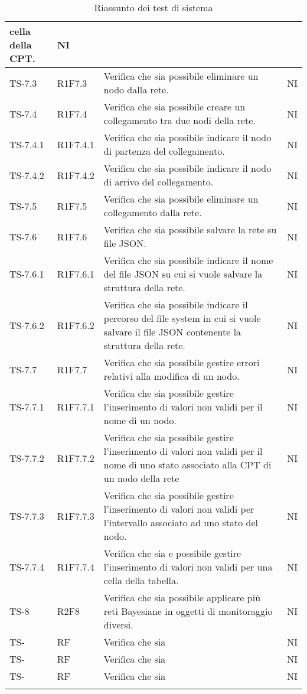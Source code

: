 \begin{longtable}{|C{2.5cm}|C{2.5cm}|C{6.5cm}|C{1.5cm}|}
			cella della CPT.  & {NI}\\
			\hline
			{TS-7.3} & {R1F7.3} & Verifica che sia possibile eliminare un
			nodo dalla rete.  & {NI}\\
			\hline
			{TS-7.4} & {R1F7.4} & Verifica che sia possibile creare un
			collegamento tra due nodi della rete.  & {NI}\\
			\hline
			{TS-7.4.1} & {R1F7.4.1} & Verifica che sia possibile indicare il nodo
			di partenza del collegamento.  & {NI}\\
			\hline
			{TS-7.4.2} & {R1F7.4.2} & Verifica che sia possibile indicare il nodo
			di arrivo del collegamento.  & {NI}\\
			\hline
			{TS-7.5} & {R1F7.5} & Verifica che sia possibile eliminare un
			collegamento dalla rete.  & {NI}\\
			\hline
			{TS-7.6} & {R1F7.6} & Verifica che sia possibile salvare la rete su
			file JSON.  & {NI}\\
			\hline
			{TS-7.6.1} & {R1F7.6.1} & Verifica che sia possibile indicare il nome
			del file JSON su cui si vuole salvare la
			struttura della rete.  & {NI}\\
			\hline
			{TS-7.6.2} & {R1F7.6.2} & Verifica che sia possibile indicare il
			percorso del file system in cui si vuole
			salvare il file JSON contenente la
			struttura della rete.  & {NI}\\
			\hline
			{TS-7.7} & {R1F7.7} & Verifica che sia possibile gestire errori
			relativi alla modifica di un nodo.  & {NI}\\
			\hline
			{TS-7.7.1} & {R1F7.7.1} & Verifica che sia  possibile gestire
			l'inserimento di valori non validi per il
			nome di un nodo.  & {NI}\\
			\hline
			{TS-7.7.2} & {R1F7.7.2} & Verifica che sia possibile gestire
			l'inserimento di valori non validi per il
			nome di uno stato associato alla CPT
			di un nodo della rete  & {NI}\\
			\hline
			{TS-7.7.3} & {R1F7.7.3} & Verifica che sia possibile gestire
			l'inserimento di valori non validi per
			l'intervallo associato ad uno stato del
			nodo.
  & {NI}\\
			\hline
			{TS-7.7.4} & {R1F7.7.4} & Verifica che sia e possibile gestire
			l'inserimento di valori non validi per
			una cella della tabella.  & {NI}\\
			\hline
			{TS-8} & {R2F8} & Verifica che sia possibile applicare più reti
			Bayesiane in oggetti di monitoraggio
			diversi.  & {NI}\\
			\hline
			{TS-} & {RF} & Verifica che sia   & {NI}\\
			\hline
			{TS-} & {RF} & Verifica che sia   & {NI}\\
			\hline
			{TS-} & {RF} & Verifica che sia   & {NI}\\
			\hline
	\caption{Riassunto dei test di sistema}
	\label{tabella:riassunto TS-}
\end{longtable}

